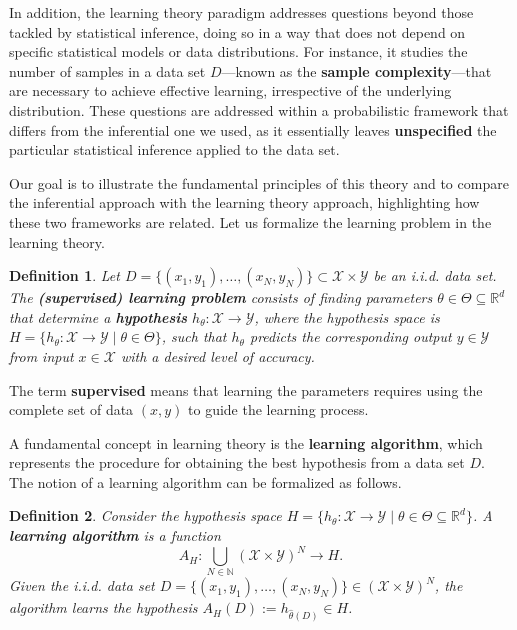 \documentclass{report}
\newtheorem{definition}{Definition}[chapter]
\begin{document}
In addition, the learning theory paradigm addresses questions beyond those tackled by statistical inference, doing so in a way that does not depend on specific statistical models or data distributions. For instance, it studies the number of samples in a data set $D$—known as the \textbf{sample complexity}—that are necessary to achieve effective learning, irrespective of the underlying distribution. These questions are addressed within a probabilistic framework that differs from the inferential one we used, as it essentially leaves \textbf{unspecified} the particular statistical inference applied to the data set.

Our goal is to illustrate the fundamental principles of this theory and to compare the inferential approach with the learning theory approach, highlighting how these two frameworks are related. Let us formalize the learning problem in the learning theory.

\begin{definition}
Let $D = \{(x_1,y_1), \dots, (x_N,y_N)\} \subset \mathcal{X} \times \mathcal{Y}$ be an i.i.d. data set. The \textbf{(supervised) learning problem} consists of finding parameters $\theta \in \Theta \subseteq \mathbb{R}^d$ that determine a \textbf{hypothesis} $h_\theta : \mathcal{X} \to \mathcal{Y}$, where the hypothesis space is $H = \{ h_\theta : \mathcal{X} \to \mathcal{Y} \mid \theta \in \Theta \}$, such that $h_\theta$ predicts the corresponding output $y \in \mathcal{Y}$ from input $x \in \mathcal{X}$ with a desired level of accuracy.
\end{definition}

The term \textbf{supervised} means that learning the parameters requires using the complete set of data $(x,y)$ to guide the learning process.

A fundamental concept in learning theory is the \textbf{learning algorithm}, which represents the procedure for obtaining the best hypothesis from a data set $D$. The notion of a learning algorithm can be formalized as follows.

\begin{definition}
Consider the hypothesis space $H = \{h_\theta : \mathcal{X} \to \mathcal{Y} \mid\theta\in\Theta\subseteq\mathbb{R}^d\}$. A \textbf{learning algorithm} is a function
\[ A_H : \bigcup_{N \in \mathbb{N}} (\mathcal{X}\times \mathcal{Y}) ^N\to H.\]
Given the  i.i.d. data set $D = \{(x_1,y_1), \dots, (x_N,y_N)\} \in (\mathcal{X} \times \mathcal{Y})^N$, the algorithm learns the hypothesis $A_H(D) := h_{\hat{\theta}(D)} \in H$.
\end{definition}
\end{document}
